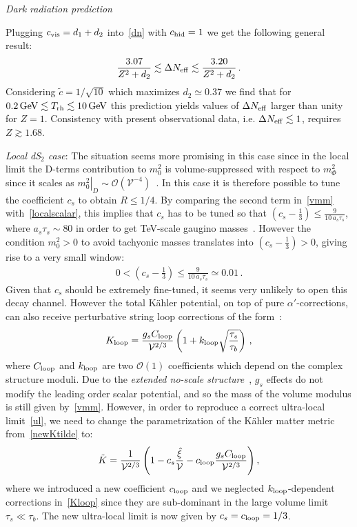 \documentclass[12pt,a4paper]{book}
\newcommand\vo{{\mathcal{V}}}
\newcommand{\mc}{\mathcal}
\begin{document}
\textit{Dark radiation prediction}

Plugging $c_{\rm vis} = d_1 + d_2$ into~\eqref{dn} with $c_{\rm hid}=1$ we get the following general result:
\begin{align}
\frac{3.07}{Z^2 + d_2}\lesssim \Delta N_{\rm eff}\lesssim  \frac{3.20}{Z^2 + d_2}\,.
\label{dS1pred}
\end{align}
Considering $\tilde{c} = 1/\sqrt{10}$ which maximizes $d_2 \simeq 0.37$ we find that for $0.2 \, {\rm GeV} \lesssim T_{\rm rh} \lesssim 10 \, {\rm GeV}$ this prediction yields values of $\Delta N_{\rm eff}$ larger than unity for $Z = 1$. Consistency with present observational data, i.e. $\Delta N_{\rm eff}\lesssim 1$, requires $Z\gtrsim 1.68$.

\item \emph{Local dS$_2$ case}: The situation seems more promising in this case since in the local limit the D-terms contribution to $m_0^2$ is volume-suppressed with respect to $m_\Phi^2$ since it scales as $\left. m_0^2\right|_D \sim \mc{O}\left(\vo^{-4}\right)$~\cite{Aparicio:2014wxa}. In this case it is therefore possible to tune the coefficient $c_s$ to obtain $R\leq 1/4$. By comparing the second term in~\eqref{vmm} with~\eqref{localscalar}, this implies that $c_s$ has to be tuned so that $\left(c_s - \frac 13\right) \leq \frac{9}{10 \, a_s \tau_s}$, where $a_s \tau_s \sim 80$ in order to get TeV-scale gaugino masses~\cite{Aparicio:2014wxa}. However the condition $m_0^2 > 0$ to avoid tachyonic masses translates into $\left(c_s - \frac 13\right)>0$, giving rise to a very small window: 
\begin{align}
0 < \left( c_s- \frac 13 \right) \leq \frac{9}{10 \, a_s \tau_s} \simeq 0.01\,.
\end{align}
Given that $c_s$ should be extremely fine-tuned, it seems very unlikely to open this decay channel. However the total K\"ahler potential, 
on top of pure $\alpha'$-corrections, can also receive perturbative string loop corrections of the form~\cite{Berg:2007wt}:
\begin{align}
K_{\rm loop} = \frac{g_s C_{\rm loop}}{\vo^{2/3}}\left(1+ k_{\rm loop}\sqrt{\frac{\tau_s}{\tau_b}}\right)\,,
\label{Kloop}
\end{align}
where $C_{\rm loop}$ and $k_{\rm loop}$ are two $\mc{O}(1)$ coefficients which depend on the complex structure moduli. Due to the \textit{extended no-scale structure}~\cite{Cicoli:2007xp}, $g_s$ effects do not modify the leading order scalar potential, and so the mass of the volume modulus is still given by~\eqref{vmm}. However, in order to reproduce a correct ultra-local limit~\eqref{ul}, we need to change the parametrization of the K\"ahler matter metric from~\eqref{newKtilde} to:
\begin{align}
\tilde{K} = \frac{1}{\vo^{2/3}} \left(1 - c_s \frac{\hat{\xi}}{\vo} - c_{\rm loop} \frac{g_s C_{\rm loop}}{\vo^{2/3}} \right),
\label{KtildeNew}
\end{align}
where we introduced a new coefficient $c_{\rm loop}$ and we neglected $k_{\rm loop}$-dependent corrections in~\eqref{Kloop} since they are sub-dominant in the large volume limit $\tau_s\ll\tau_b$. The new ultra-local limit is now given by $c_s = c_{\rm loop} = 1/3$. 
\end{document}
